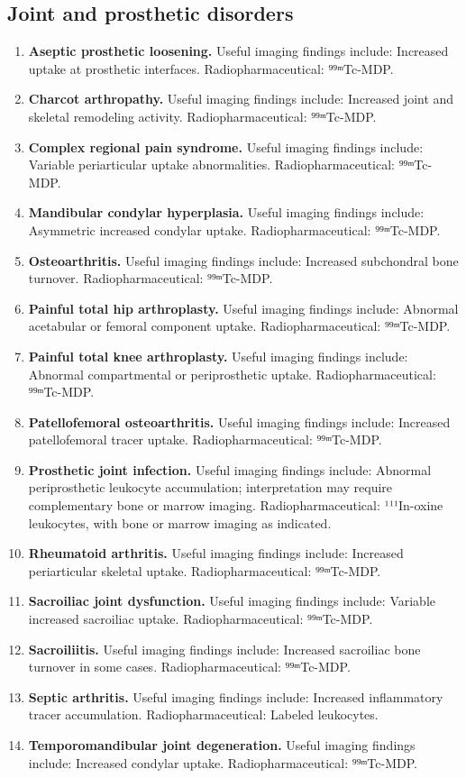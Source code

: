 \subsection{Joint and prosthetic disorders}
\begin{enumerate}[leftmargin=*,itemsep=0.45em,topsep=0.4em]
\item \textbf{Aseptic prosthetic loosening.} Useful imaging findings include: Increased uptake at prosthetic interfaces. Radiopharmaceutical: ⁹⁹ᵐTc-MDP.
\item \textbf{Charcot arthropathy.} Useful imaging findings include: Increased joint and skeletal remodeling activity. Radiopharmaceutical: ⁹⁹ᵐTc-MDP.
\item \textbf{Complex regional pain syndrome.} Useful imaging findings include: Variable periarticular uptake abnormalities. Radiopharmaceutical: ⁹⁹ᵐTc-MDP.
\item \textbf{Mandibular condylar hyperplasia.} Useful imaging findings include: Asymmetric increased condylar uptake. Radiopharmaceutical: ⁹⁹ᵐTc-MDP.
\item \textbf{Osteoarthritis.} Useful imaging findings include: Increased subchondral bone turnover. Radiopharmaceutical: ⁹⁹ᵐTc-MDP.
\item \textbf{Painful total hip arthroplasty.} Useful imaging findings include: Abnormal acetabular or femoral component uptake. Radiopharmaceutical: ⁹⁹ᵐTc-MDP.
\item \textbf{Painful total knee arthroplasty.} Useful imaging findings include: Abnormal compartmental or periprosthetic uptake. Radiopharmaceutical: ⁹⁹ᵐTc-MDP.
\item \textbf{Patellofemoral osteoarthritis.} Useful imaging findings include: Increased patellofemoral tracer uptake. Radiopharmaceutical: ⁹⁹ᵐTc-MDP.
\item \textbf{Prosthetic joint infection.} Useful imaging findings include: Abnormal periprosthetic leukocyte accumulation; interpretation may require complementary bone or marrow imaging. Radiopharmaceutical: ¹¹¹In-oxine leukocytes, with bone or marrow imaging as indicated.
\item \textbf{Rheumatoid arthritis.} Useful imaging findings include: Increased periarticular skeletal uptake. Radiopharmaceutical: ⁹⁹ᵐTc-MDP.
\item \textbf{Sacroiliac joint dysfunction.} Useful imaging findings include: Variable increased sacroiliac uptake. Radiopharmaceutical: ⁹⁹ᵐTc-MDP.
\item \textbf{Sacroiliitis.} Useful imaging findings include: Increased sacroiliac bone turnover in some cases. Radiopharmaceutical: ⁹⁹ᵐTc-MDP.
\item \textbf{Septic arthritis.} Useful imaging findings include: Increased inflammatory tracer accumulation. Radiopharmaceutical: Labeled leukocytes.
\item \textbf{Temporomandibular joint degeneration.} Useful imaging findings include: Increased condylar uptake. Radiopharmaceutical: ⁹⁹ᵐTc-MDP.
\end{enumerate}

